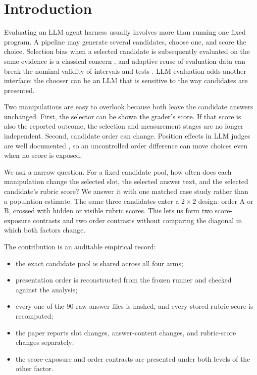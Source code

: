 \documentclass[11pt]{article}
\begin{document}
\section{Introduction}

Evaluating an LLM agent harness usually involves more than running one fixed program. A pipeline may
generate several candidates, choose one, and score the choice. Selection bias when a selected
candidate is subsequently evaluated on the same evidence is a classical concern
\citep{cawley2010overfitting}, and adaptive reuse of evaluation data can break the nominal validity
of intervals and tests \citep{dwork2015holdout}. LLM evaluation adds another interface: the chooser
can be an LLM that is sensitive to the way candidates are presented.

Two manipulations are easy to overlook because both leave the candidate answers unchanged. First,
the selector can be shown the grader's score. If that score is also the reported outcome, the
selection and measurement stages are no longer independent. Second, candidate order can change.
Position effects in LLM judges are well documented \citep{shi2024judgingjudges}, so an uncontrolled
order difference can move choices even when no score is exposed.

We ask a narrow question. For a fixed candidate pool, how often does each manipulation change the
selected slot, the selected answer text, and the selected candidate's rubric score? We answer it with
one matched case study rather than a population estimate. The same three candidates enter a
\(2\times2\) design: order A or B, crossed with hidden or visible rubric scores. This lets us form two
score-exposure contrasts and two order contrasts without comparing the diagonal in which both
factors change.

The contribution is an auditable empirical record:
\begin{itemize}
\item the exact candidate pool is shared across all four arms;
\item presentation order is reconstructed from the frozen runner and checked against the analysis;
\item every one of the 90 raw answer files is hashed, and every stored rubric score is recomputed;
\item the paper reports slot changes, answer-content changes, and rubric-score changes separately;
\item the score-exposure and order contrasts are presented under both levels of the other factor.
\end{itemize}
\end{document}
